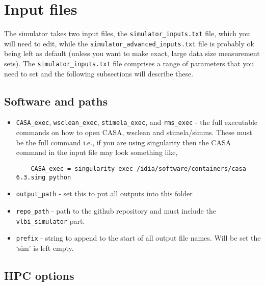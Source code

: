 \documentclass[11pt]{report_jfr}
\begin{document}
\section{Input files}\label{ss:inputfile}

The simulator takes two input files, the \texttt{simulator\_inputs.txt} file, which you will need to edit, while the \texttt{simulator\_advanced\_inputs.txt} file is probably ok being left as default (unless you want to make exact, large data size measurement sets). The \texttt{simulator\_inputs.txt} file comprises a range of parameters that you need to set and the following subsections will describe these.

\subsection{Software and paths}
\begin{itemize}
	\item \texttt{CASA\_exec}, \texttt{wsclean\_exec}, \texttt{stimela\_exec}, and \texttt{rms\_exec} - the full executable commands on how to open CASA, wsclean and stimela/simms. These must be the full command i.e., if you are using singularity then the CASA command in the input file may look something like,
	\begin{lstlisting}
	CASA_exec = singularity exec /idia/software/containers/casa-6.3.simg python
	\end{lstlisting}
	\item \texttt{output\_path} - set this to put all outputs into this folder
	\item \texttt{repo\_path} - path to the github repository and must include the \texttt{vlbi\_simulator} part.
	\item \texttt{prefix} - string to append to the start of all output file names. Will be set the `sim' is left empty.
\end{itemize}

\subsection{HPC options}
\end{document}
